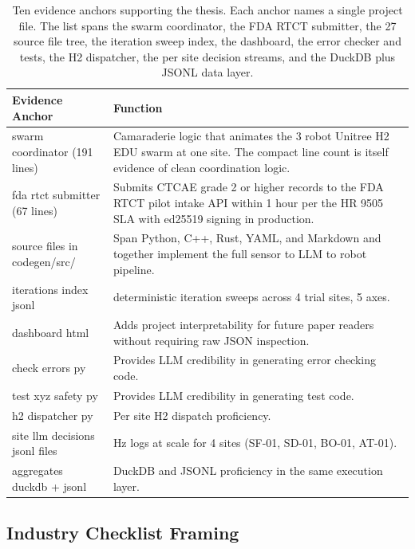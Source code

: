 \begin{sectionaccent}
\begin{table}[H]
\captionsetup{type=table}
\caption{Ten evidence anchors supporting the thesis. Each anchor
names a single project file. The list spans the swarm coordinator,
the FDA RTCT submitter, the 27 source file tree, the iteration
sweep index, the dashboard, the error checker and tests, the H2
dispatcher, the per site decision streams, and the DuckDB plus JSONL
data layer.}
\label{tbl:evidence-anchors}
\small
\begin{tabular}{>{\raggedright\arraybackslash}p{5cm}
                >{\raggedright\arraybackslash}p{10cm}}
\toprule
\textbf{Evidence Anchor} & \textbf{Function} \\
\midrule
swarm coordinator (191 lines) & Camaraderie logic that animates the 3 robot Unitree H2 EDU swarm at one site. The compact line count is itself evidence of clean coordination logic. \\
fda rtct submitter (67 lines) & Submits CTCAE grade 2 or higher records to the FDA RTCT pilot intake API within 1 hour per the HR 9505 SLA with ed25519 signing in production. \\
27 source files in codegen/src/ & Span Python, C++, Rust, YAML, and Markdown and together implement the full sensor to LLM to robot pipeline. \\
iterations index jsonl & 32 deterministic iteration sweeps across 4 trial sites, 5 axes. \\
dashboard html & Adds project interpretability for future paper readers without requiring raw JSON inspection. \\
check errors py & Provides LLM credibility in generating error checking code. \\
test xyz safety py & Provides LLM credibility in generating test code. \\
h2 dispatcher py & Per site H2 dispatch proficiency. \\
4 site llm decisions jsonl files & 1 Hz logs at scale for 4 sites (SF-01, SD-01, BO-01, AT-01). \\
aggregates duckdb + jsonl & DuckDB and JSONL proficiency in the same execution layer. \\
\bottomrule
\end{tabular}
\end{table}

\subsection{Industry Checklist Framing}
\label{sec:conclusions-checklist}


\end{sectionaccent}
